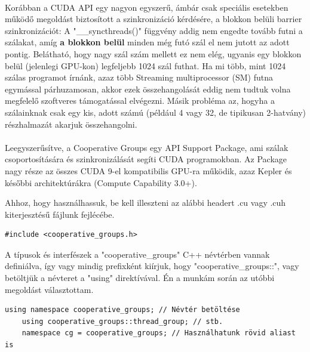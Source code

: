 \paragraph{}
Korábban a CUDA API egy nagyon egyszerű, ámbár csak speciális esetekben működő megoldást biztosított a szinkronizáció kérdésére, a blokkon belüli barrier szinkronizációt: A "\_\_syncthreads()" függvény addig nem engedte tovább futni a szálakat, amíg \textbf{a blokkon belül} minden még futó szál el nem jutott az adott pontig. Belátható, hogy nagy szál szám mellett ez nem elég, ugyanis egy blokkon belül (jelenlegi GPU-kon) legfeljebb 1024 szál futhat. Ha mi több, mint 1024 szálas programot írnánk, azaz több Streaming multiprocessor (SM) futna egymással párhuzamosan, akkor ezek összehangolását eddig nem tudtuk volna megfelelő szoftveres támogatással elvégezni. Másik probléma az, hogyha a szálainknak csak egy kis, adott számú (például 4 vagy 32, de tipikusan 2-hatvány) részhalmazát akarjuk összehangolni.

\paragraph{}
Leegyszerűsítve, a Cooperative Groups egy API Support Package, ami szálak csoportosítására és szinkronizálását segíti CUDA programokban. Az Package nagy része az összes CUDA 9-el kompatibilis GPU-ra működik, azaz Kepler és későbbi architektúrákra (Compute Capability 3.0+).

Ahhoz, hogy használhassuk, be kell illeszteni az alábbi headert .cu vagy .cuh kiterjesztésű fájlunk fejlécébe.

\begin{lstlisting}[style=CStyle]
	#include <cooperative_groups.h>
\end{lstlisting}

A típusok és interfészek a "cooperative\_groups" C++ névtérben vannak definiálva, így vagy mindig prefixként kiírjuk, hogy "cooperative\_groups::", vagy betöltjük a névteret a "using" direktívával. Én a munkám során az utóbbi megoldást választottam.

\begin{lstlisting}[style=CStyle]
	using namespace cooperative_groups; // Névtér betöltése
	using cooperative_groups::thread_group; // stb. 
	namespace cg = cooperative_groups; // Használhatunk rövid aliast is
\end{lstlisting}

